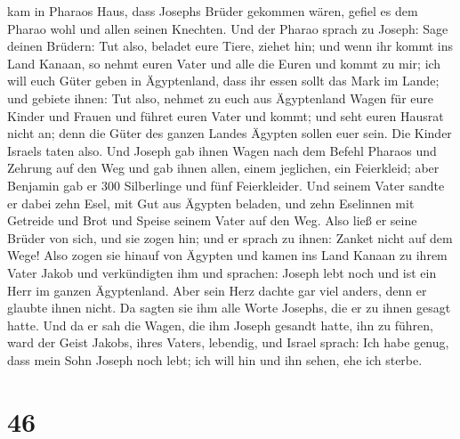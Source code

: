 kam in Pharaos Haus, dass Josephs Brüder gekommen wären, gefiel es dem
Pharao wohl und allen seinen Knechten.  Und der Pharao
sprach zu Joseph: Sage deinen Brüdern: Tut also, beladet eure Tiere,
ziehet hin;  und wenn ihr kommt ins Land Kanaan, so nehmt
euren Vater und alle die Euren und kommt zu mir; ich will euch Güter
geben in Ägyptenland, dass ihr essen sollt das Mark im Lande;
 und gebiete ihnen: Tut also, nehmet zu euch aus
Ägyptenland Wagen für eure Kinder und Frauen und führet euren Vater und
kommt;  und seht euren Hausrat nicht an; denn die Güter
des ganzen Landes Ägypten sollen euer sein.  Die Kinder
Israels taten also. Und Joseph gab ihnen Wagen nach dem Befehl Pharaos
und Zehrung auf den Weg  und gab ihnen allen, einem
jeglichen, ein Feierkleid; aber Benjamin gab er 300 Silberlinge und fünf
Feierkleider.  Und seinem Vater sandte er dabei zehn
Esel, mit Gut aus Ägypten beladen, und zehn Eselinnen mit Getreide und
Brot und Speise seinem Vater auf den Weg.  Also ließ er
seine Brüder von sich, und sie zogen hin; und er sprach zu ihnen: Zanket
nicht auf dem Wege!  Also zogen sie hinauf von Ägypten
und kamen ins Land Kanaan zu ihrem Vater Jakob  und
verkündigten ihm und sprachen: Joseph lebt noch und ist ein Herr im
ganzen Ägyptenland. Aber sein Herz dachte gar viel anders, denn er
glaubte ihnen nicht.  Da sagten sie ihm alle Worte
Josephs, die er zu ihnen gesagt hatte. Und da er sah die Wagen, die ihm
Joseph gesandt hatte, ihn zu führen, ward der Geist Jakobs, ihres
Vaters, lebendig,  und Israel sprach: Ich habe genug,
dass mein Sohn Joseph noch lebt; ich will hin und ihn sehen, ehe ich
sterbe.

\hypertarget{section-45}{%
\section{46}\label{section-45}}

